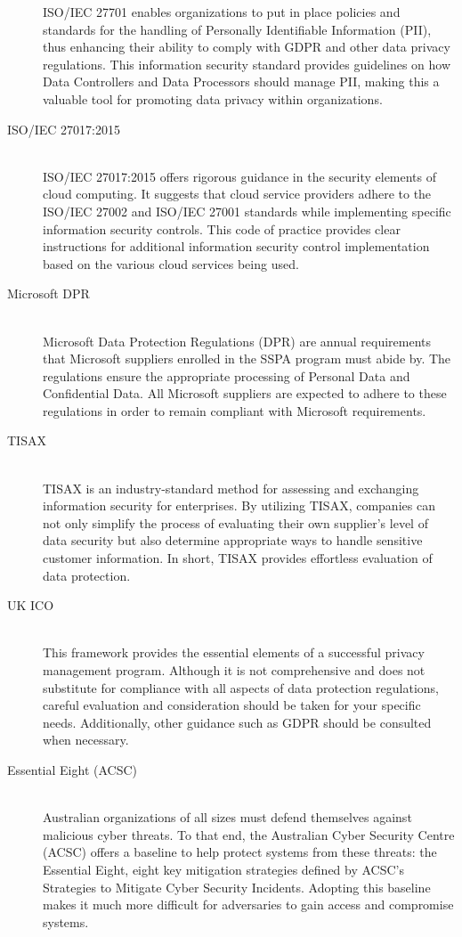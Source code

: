 \begin{description}
          ISO/IEC 27701 enables organizations to put in place policies and standards for the handling of Personally Identifiable Information (PII), thus enhancing their ability to comply with GDPR and other data privacy regulations. This information security standard provides guidelines on how Data Controllers and Data Processors should manage PII, making this a valuable tool for promoting data privacy within organizations.
     \item[ISO/IEC 27017:2015] \hfill \\
          ISO/IEC 27017:2015 offers rigorous guidance in the security elements of cloud computing. It suggests that cloud service providers adhere to the ISO/IEC 27002 and ISO/IEC 27001 standards while implementing specific information security controls. This code of practice provides clear instructions for additional information security control implementation based on the various cloud services being used.
     \item[Microsoft DPR] \hfill \\
          Microsoft Data Protection Regulations (DPR) are annual requirements that Microsoft suppliers enrolled in the SSPA program must abide by. The regulations ensure the appropriate processing of Personal Data and Confidential Data. All Microsoft suppliers are expected to adhere to these regulations in order to remain compliant with Microsoft requirements.
     \item[TISAX] \hfill \\
          TISAX is an industry-standard method for assessing and exchanging information security for enterprises. By utilizing TISAX, companies can not only simplify the process of evaluating their own supplier's level of data security but also determine appropriate ways to handle sensitive customer information. In short, TISAX provides effortless evaluation of data protection.
     \item[UK ICO] \hfill \\
          This framework provides the essential elements of a successful privacy management program. Although it is not comprehensive and does not substitute for compliance with all aspects of data protection regulations, careful evaluation and consideration should be taken for your specific needs. Additionally, other guidance such as GDPR should be consulted when necessary.
     \item[Essential Eight (ACSC)] \hfill \\
          Australian organizations of all sizes must defend themselves against malicious cyber threats. To that end, the Australian Cyber Security Centre (ACSC) offers a baseline to help protect systems from these threats: the Essential Eight, eight key mitigation strategies defined by ACSC's Strategies to Mitigate Cyber Security Incidents. Adopting this baseline makes it much more difficult for adversaries to gain access and compromise systems.

\end{description}
